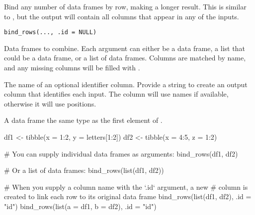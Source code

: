 \documentclass[a4paper]{book}
\begin{document}
%
\begin{Description}
Bind any number of data frames by row, making a longer result. This is
similar to , but the output will contain all columns
that appear in any of the inputs.
\end{Description}
%
\begin{Usage}
\begin{verbatim}
bind_rows(..., .id = NULL)
\end{verbatim}
\end{Usage}
%
\begin{Arguments}
\begin{ldescription}
\item[\code{...}] Data frames to combine. Each argument can either be a data frame,
a list that could be a data frame, or a list of data frames. Columns are
matched by name, and any missing columns will be filled with .

\item[\code{.id}] The name of an optional identifier column. Provide a string to
create an output column that identifies each input. The column will use
names if available, otherwise it will use positions.
\end{ldescription}
\end{Arguments}
%
\begin{Value}
A data frame the same type as the first element of .
\end{Value}
%
\begin{Examples}
\begin{ExampleCode}
df1 <- tibble(x = 1:2, y = letters[1:2])
df2 <- tibble(x = 4:5, z = 1:2)

# You can supply individual data frames as arguments:
bind_rows(df1, df2)

# Or a list of data frames:
bind_rows(list(df1, df2))

# When you supply a column name with the `.id` argument, a new
# column is created to link each row to its original data frame
bind_rows(list(df1, df2), .id = "id")
bind_rows(list(a = df1, b = df2), .id = "id")
\end{ExampleCode}
\end{Examples}
%
\end{document}
